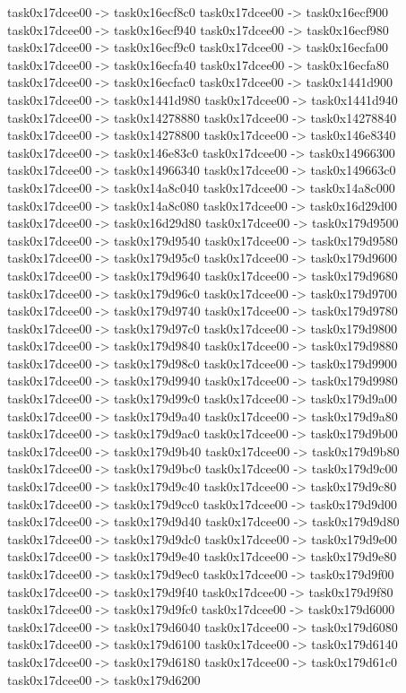 {	task0x17dcee00 -> task0x16ecf8c0
	task0x17dcee00 -> task0x16ecf900
	task0x17dcee00 -> task0x16ecf940
	task0x17dcee00 -> task0x16ecf980
	task0x17dcee00 -> task0x16ecf9c0
	task0x17dcee00 -> task0x16ecfa00
	task0x17dcee00 -> task0x16ecfa40
	task0x17dcee00 -> task0x16ecfa80
	task0x17dcee00 -> task0x16ecfac0
	task0x17dcee00 -> task0x1441d900
	task0x17dcee00 -> task0x1441d980
	task0x17dcee00 -> task0x1441d940
	task0x17dcee00 -> task0x14278880
	task0x17dcee00 -> task0x14278840
	task0x17dcee00 -> task0x14278800
	task0x17dcee00 -> task0x146e8340
	task0x17dcee00 -> task0x146e83c0
	task0x17dcee00 -> task0x14966300
	task0x17dcee00 -> task0x14966340
	task0x17dcee00 -> task0x149663c0
	task0x17dcee00 -> task0x14a8c040
	task0x17dcee00 -> task0x14a8c000
	task0x17dcee00 -> task0x14a8c080
	task0x17dcee00 -> task0x16d29d00
	task0x17dcee00 -> task0x16d29d80
	task0x17dcee00 -> task0x179d9500
	task0x17dcee00 -> task0x179d9540
	task0x17dcee00 -> task0x179d9580
	task0x17dcee00 -> task0x179d95c0
	task0x17dcee00 -> task0x179d9600
	task0x17dcee00 -> task0x179d9640
	task0x17dcee00 -> task0x179d9680
	task0x17dcee00 -> task0x179d96c0
	task0x17dcee00 -> task0x179d9700
	task0x17dcee00 -> task0x179d9740
	task0x17dcee00 -> task0x179d9780
	task0x17dcee00 -> task0x179d97c0
	task0x17dcee00 -> task0x179d9800
	task0x17dcee00 -> task0x179d9840
	task0x17dcee00 -> task0x179d9880
	task0x17dcee00 -> task0x179d98c0
	task0x17dcee00 -> task0x179d9900
	task0x17dcee00 -> task0x179d9940
	task0x17dcee00 -> task0x179d9980
	task0x17dcee00 -> task0x179d99c0
	task0x17dcee00 -> task0x179d9a00
	task0x17dcee00 -> task0x179d9a40
	task0x17dcee00 -> task0x179d9a80
	task0x17dcee00 -> task0x179d9ac0
	task0x17dcee00 -> task0x179d9b00
	task0x17dcee00 -> task0x179d9b40
	task0x17dcee00 -> task0x179d9b80
	task0x17dcee00 -> task0x179d9bc0
	task0x17dcee00 -> task0x179d9c00
	task0x17dcee00 -> task0x179d9c40
	task0x17dcee00 -> task0x179d9c80
	task0x17dcee00 -> task0x179d9cc0
	task0x17dcee00 -> task0x179d9d00
	task0x17dcee00 -> task0x179d9d40
	task0x17dcee00 -> task0x179d9d80
	task0x17dcee00 -> task0x179d9dc0
	task0x17dcee00 -> task0x179d9e00
	task0x17dcee00 -> task0x179d9e40
	task0x17dcee00 -> task0x179d9e80
	task0x17dcee00 -> task0x179d9ec0
	task0x17dcee00 -> task0x179d9f00
	task0x17dcee00 -> task0x179d9f40
	task0x17dcee00 -> task0x179d9f80
	task0x17dcee00 -> task0x179d9fc0
	task0x17dcee00 -> task0x179d6000
	task0x17dcee00 -> task0x179d6040
	task0x17dcee00 -> task0x179d6080
	task0x17dcee00 -> task0x179d6100
	task0x17dcee00 -> task0x179d6140
	task0x17dcee00 -> task0x179d6180
	task0x17dcee00 -> task0x179d61c0
	task0x17dcee00 -> task0x179d6200
}
